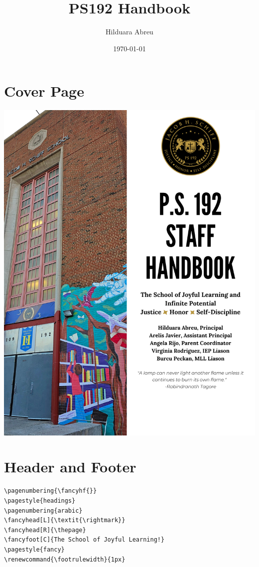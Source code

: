 \documentclass[11pt]{article}
\author{Hilduara Abreu}
\date{\today}
\title{PS192 Handbook}
\begin{document}
\maketitle
\tableofcontents


\section{Cover Page}
\label{sec:org018b6dc}
\begin{center}
\includegraphics[width=.9\linewidth]{./handbook_front.pdf}
\end{center}

\section{Header and Footer}
\label{sec:org06e988d}
\begin{verbatim}
\pagenumbering{\fancyhf{}}
\pagestyle{headings}
\pagenumbering{arabic}
\fancyhead[L]{\textit{\rightmark}}
\fancyhead[R]{\thepage}
\fancyfoot[C]{The School of Joyful Learning!}
\pagestyle{fancy}
\renewcommand{\footrulewidth}{1px}
\end{verbatim}
\end{document}
